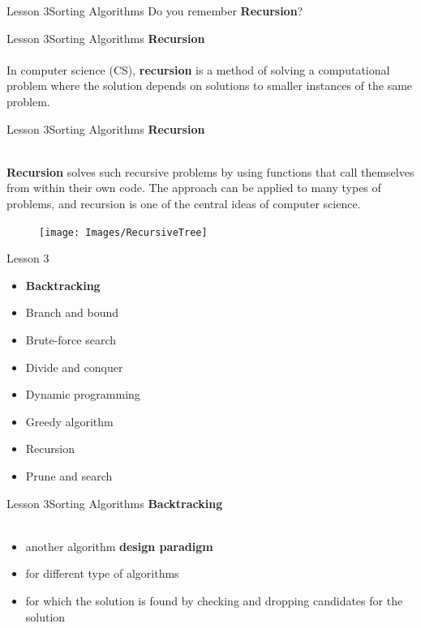 \documentclass[aspectratio=1610]{beamer}
\begin{document}
\begin{frame}{Lesson 3}{Sorting Algorithms}
\Huge
Do you remember \textbf{Recursion}?
\end{frame}


\begin{frame}{Lesson 3}{Sorting Algorithms}
\LARGE
\textbf{Recursion}\\~\\
In computer science (CS), \textbf{recursion} is a method of solving a 
computational problem where the solution depends on solutions to smaller instances of 
the same problem.
\end{frame}


\begin{frame}{Lesson 3}{Sorting Algorithms}
\LARGE
\textbf{Recursion}\\~\\
\begin{minipage}{0.65\textwidth}
\Large
\textbf{Recursion} solves such recursive problems by using functions that call 
themselves from within their own code. The approach can be applied to many 
types of problems, and recursion is one of the central ideas of computer science.
\end{minipage}
\begin{minipage}{.0\textwidth}
      \begin{figure}
        \texttt{[image: Images/RecursiveTree]}
      \end{figure}
  \end{minipage}  
\end{frame}



\begin{frame}{Lesson 3}{}
\Large
\begin{itemize}
    \item \textbf{Backtracking}
    \item Branch and bound
    \item Brute-force search
    \item Divide and conquer
    \item Dynamic programming
    \item Greedy algorithm
    \item Recursion
    \item Prune and search
\end{itemize}
\end{frame}


\begin{frame}{Lesson 3}{Sorting Algorithms}
\LARGE
\textbf{Backtracking}\\~\\
\Large
\begin{itemize}
	\item another algorithm \textbf{design paradigm}
	\item for different type of algorithms
	\item for which the solution is found by checking and dropping candidates for the solution
\end{itemize}
\end{frame}
\end{document}
